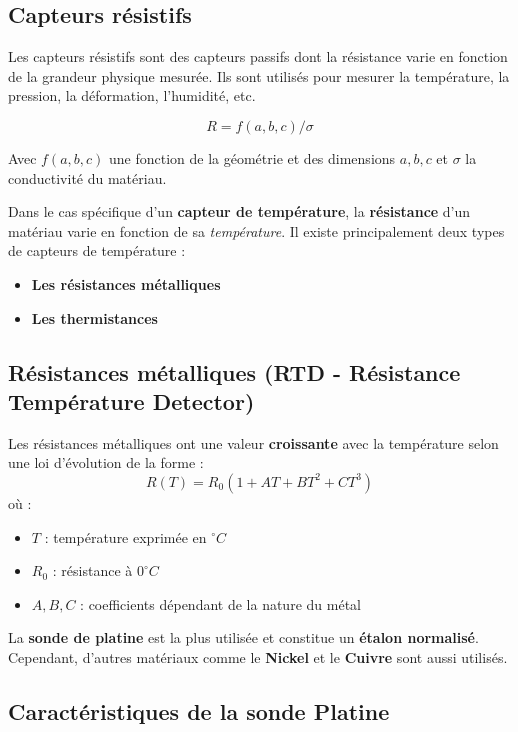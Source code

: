 \subsection*{Capteurs résistifs}
Les capteurs résistifs sont des capteurs passifs dont la résistance varie en
fonction de la grandeur physique mesurée. Ils sont utilisés pour mesurer la
température, la pression, la déformation, l'humidité, etc.

\[
    R = f(a,b,c)/\sigma
\]

Avec \(f(a,b,c)\) une fonction de la géométrie et des dimensions \(a,b,c\) et 
\(\sigma\) la conductivit\'e du mat\'eriau.

Dans le cas spécifique d'un \textbf{capteur de température}, la 
\textbf{résistance} d'un matériau varie en fonction de sa \textit{température}.  
Il existe principalement deux types de capteurs de température :
\begin{itemize}
    \item \textbf{Les résistances métalliques}
    \item \textbf{Les thermistances}
\end{itemize}

\subsection*{Résistances métalliques (RTD - Résistance Température Detector)}

Les résistances métalliques ont une valeur \textbf{croissante} avec la 
température selon une loi d'évolution de la forme :
\begin{equation}
    R(T) = R_0 (1 + A T + B T^2 + C T^3)
\end{equation}
où :
\begin{itemize}
    \item \( T \) : température exprimée en \(^\circ C\)
    \item \( R_0 \) : résistance à \( 0^\circ C \)
    \item \( A, B, C \) : coefficients dépendant de la nature du métal
\end{itemize}

La \textbf{sonde de platine} est la plus utilisée et constitue un 
\textbf{étalon normalisé}. Cependant, d'autres matériaux comme le \textbf{Nickel} 
et le \textbf{Cuivre} sont aussi utilisés.

\subsection*{Caractéristiques de la sonde Platine}

